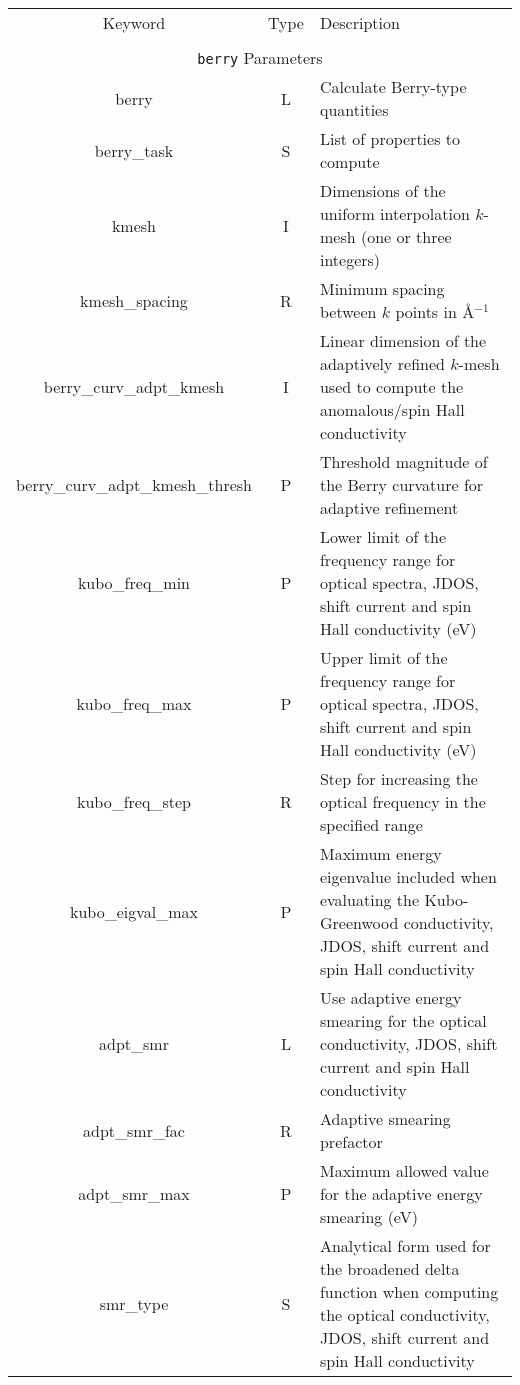 \begin{longtable}{|c|c|p{6cm}|}
  \hline
  Keyword & Type & Description \\
  &      &             \\
  \hline\hline
  \multicolumn{3}{|c|}{{\tt berry} Parameters} \\
  \hline
  {\sc berry}  & L & Calculate Berry-type quantities \\
  {\sc berry\_task}& S  & List of properties to compute \\
  {\sc [berry\_]kmesh} & I & Dimensions of the uniform interpolation $k$-mesh 
  (one or three integers)\\ 
  {\sc [berry\_]kmesh\_spacing}& R & Minimum spacing between $k$ points in 
  \AA$^{-1}$\\
  {\sc berry\_curv\_adpt\_kmesh} & I & Linear dimension of the adaptively refined $k$-mesh used to compute the anomalous/spin Hall conductivity\\ 
  {\sc berry\_curv\_adpt\_kmesh\_thresh} & P & Threshold magnitude
  of the Berry curvature for adaptive refinement\\ 
  {\sc kubo\_freq\_min} & P & Lower limit of the frequency range for
  optical spectra, JDOS, shift current and spin Hall conductivity (eV) \\
  {\sc kubo\_freq\_max}& P & Upper limit of the frequency range for
  optical spectra, JDOS, shift current and spin Hall conductivity (eV) \\
  {\sc kubo\_freq\_step}& R &  Step for increasing
the optical frequency in the specified range\\
  {\sc kubo\_eigval\_max}& P &  Maximum energy eigenvalue
  included when evaluating the Kubo-Greenwood conductivity, JDOS, shift current and spin Hall conductivity\\
  {\sc [kubo\_]adpt\_smr} & L & Use adaptive energy smearing for the 
  optical conductivity, JDOS, shift current and spin Hall conductivity \\
  {\sc [kubo\_]adpt\_smr\_fac} & R & Adaptive smearing prefactor \\
  {\sc[kubo\_]adpt\_smr\_max} & P & Maximum allowed value for the 
  adaptive energy smearing (eV) \\
  {\sc [kubo\_]smr\_type} & S & Analytical form used for the broadened delta function
  when computing the optical conductivity, JDOS, shift current and spin Hall conductivity\\  

\end{longtable}

